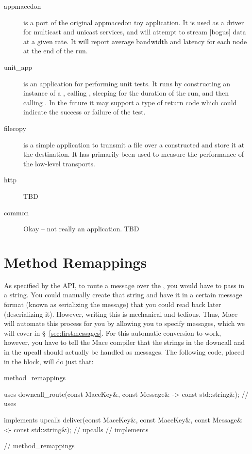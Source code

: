 \begin{description}
\item[appmacedon]  is a port of the original appmacedon toy 
  application.  It is used as a driver for multicast and unicast services, and will
  attempt to stream [bogus] data at a given rate.  It will report average bandwidth
  and latency for each node at the end of the run.
\item[unit\_app]  is an application for performing unit tests.
  It runs by constructing an instance of a , calling
  , sleeping for the duration of the run, and then calling
  .  In the future it may support a type of return code which 
  could indicate the success or failure of the test.
\item[filecopy]  is a simple application to transmit a file
  over a constructed  and store it at the destination.
  It has primarily been used to measure the performance of the low-level transports.
\item[http] TBD %
\item[common] Okay -- not really an application. TBD %
\end{description}

\section{Method Remappings}
\label{sec:method-remappings}
As specified by the  API, to route a
message over the , you would have to pass in a
string.  You could manually create that string and have it in a
certain message format (known as serializing the message) that you
could read back later (deserializing it).  However, writing this is
mechanical and tedious.  Thus, Mace will automate this process for you
by allowing you to specify messages, which we will cover in
\S~\ref{sec:firstmessages}.  For this automatic conversion to work,
however, you have to tell the Mace compiler that the strings in the
 downcall and in the  upcall
should actually be handled as messages.  The following code, placed in
the  block, will do just that:

\begin{programlisting}
method_remappings {
  uses {
    downcall_route(const MaceKey&, const Message& -> const std::string&);
  } // uses

  implements {
    upcalls {
      deliver(const MaceKey&, const MaceKey&, const Message& <- const std::string&);
    } // upcalls
  } // implements
} // method_remappings
\end{programlisting}

